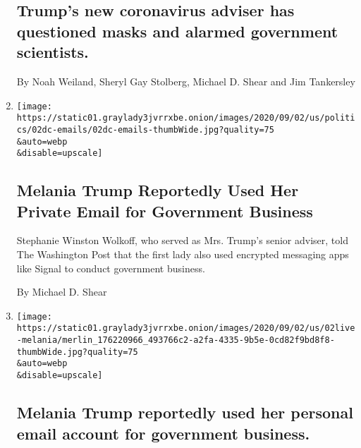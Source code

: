 \begin{enumerate}
  \hypertarget{trumps-new-coronavirus-adviser-has-questioned-masks-and-alarmed-government-scientists}{%
  \subsection{Trump's new coronavirus adviser has questioned masks and
  alarmed government
  scientists.}\label{trumps-new-coronavirus-adviser-has-questioned-masks-and-alarmed-government-scientists}}

  By Noah Weiland, Sheryl Gay Stolberg, Michael D. Shear and Jim
  Tankersley
\item
  \href{/2020/09/02/us/politics/melania-trump-emails.html}{}

  \texttt{[image: https://static01.graylady3jvrrxbe.onion/images/2020/09/02/us/politics/02dc-emails/02dc-emails-thumbWide.jpg?quality=75\\\&auto=webp\\\&disable=upscale]}

  \hypertarget{melania-trump-reportedly-used-her-private-email-for-government-business}{%
  \subsection{Melania Trump Reportedly Used Her Private Email for
  Government
  Business}\label{melania-trump-reportedly-used-her-private-email-for-government-business}}

  Stephanie Winston Wolkoff, who served as Mrs. Trump's senior adviser,
  told The Washington Post that the first lady also used encrypted
  messaging apps like Signal to conduct government business.

  By Michael D. Shear
\item
  \href{/2020/09/02/us/elections/melania-trump-reportedly-used-her-personal-email-account-for-government-business.html}{}

  \texttt{[image: https://static01.graylady3jvrrxbe.onion/images/2020/09/02/us/02live-melania/merlin\_176220966\_493766c2-a2fa-4335-9b5e-0cd82f9bd8f8-thumbWide.jpg?quality=75\\\&auto=webp\\\&disable=upscale]}

  \hypertarget{melania-trump-reportedly-used-her-personal-email-account-for-government-business}{%
  \subsection{Melania Trump reportedly used her personal email account
  for government
  business.}\label{melania-trump-reportedly-used-her-personal-email-account-for-government-business}}


\end{enumerate}
